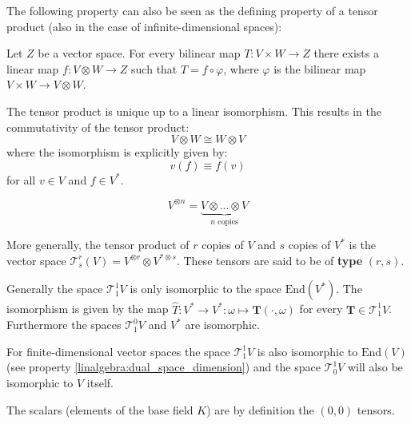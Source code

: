 	The following property can also be seen as the defining property of a tensor product (also in the case of infinite-dimensional spaces):
	\begin{property}\label{tensor:prop:universal_property}
	   	Let $Z$ be a vector space. For every bilinear map $T:V\times W\rightarrow Z$ there exists a linear map $f:V\otimes W\rightarrow Z$ such that $T = f\circ\varphi$, where $\varphi$ is the bilinear map $V\times W\rightarrow V\otimes W$.
	\end{property}
	\begin{result}
	    	The tensor product is unique up to a linear isomorphism. This results in the commutativity of the tensor product:
	    	\begin{equation}
			\label{tensor:prop:change}
	        	V\otimes W \cong W\otimes V
		\end{equation}
		where the isomorphism is explicitly given by:
	        \begin{equation}
	        	v(f) \equiv f(v)
	        \end{equation}
	        for all $v\in V$ and $f\in V^*$.
	\end{result}
    
	\begin{notation}
	    	\begin{equation}
	    		V^{\otimes n} = \underbrace{V\otimes...\otimes V}_{n\text{ copies}}
	    	\end{equation}
	\end{notation}
	\begin{remark}
	    	More generally, the tensor product of $r$ copies of $V$ and $s$ copies of $V^*$ is the vector space $\mathcal{T}^r_s(V) = V^{\otimes r}\otimes V^{*\otimes s}$. These tensors are said to be of \textbf{type} $(r, s)$.
	\end{remark}
	
	\begin{remark}
		Generally the space $\mathcal{T}^1_1V$ is only isomorphic to the space $\text{End}(V^*)$. The isomorphism is given by the map $\hat{T}:V^*\rightarrow V^*:\omega\mapsto\mathbf{T}(\cdot, \omega)$ for every $\mathbf{T}\in\mathcal{T}^1_1V$. Furthermore the spaces $\mathcal{T}^0_1V$ and $V^*$ are isomorphic.
		
		For finite-dimensional vector spaces the space $\mathcal{T}^1_1V$ is also isomorphic to $\text{End}(V)$ (see property \ref{linalgebra:dual_space_dimension}) and the space $\mathcal{T}^1_0V$ will also be isomorphic to $V$ itself.
	\end{remark}
	\begin{definition}
	    	The scalars (elements of the base field $K$) are by definition the $(0,0)$ tensors.
	\end{definition}


